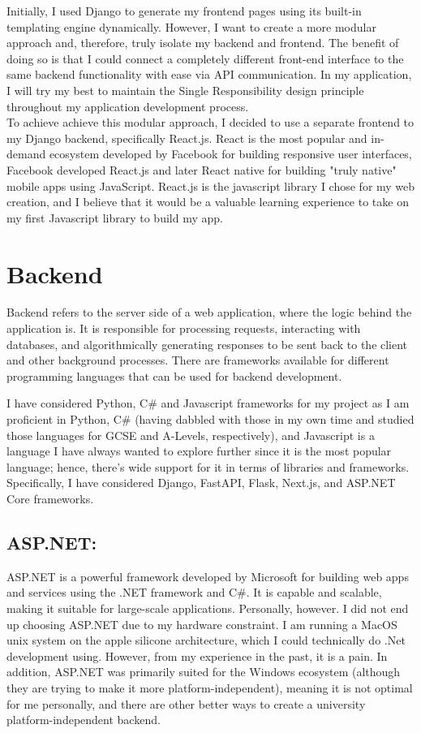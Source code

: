 Initially, I used Django to generate my frontend pages using its built-in templating engine dynamically. However, I want to create a more modular approach and, therefore, truly isolate my backend and frontend. The benefit of doing so is that I could connect a completely different front-end interface to the same backend functionality with ease via API communication. In my application, I will try my best to maintain the Single Responsibility design principle throughout my application development process.\\
To achieve achieve this modular approach, I decided to use a separate frontend to my Django backend, specifically React.js. React is the most popular and in-demand ecosystem developed by Facebook for building responsive user interfaces, Facebook developed React.js and later React native for building "truly native" mobile apps using JavaScript. React.js is the javascript library I chose for my web creation, and I believe that it would be a valuable learning experience to take on my first Javascript library to build my app.

\section{Backend}
Backend refers to the server side of a web application, where the logic behind the application is. It is responsible for processing requests, interacting with databases, and algorithmically generating responses to be sent back to the client and other background processes. There are frameworks available for different programming languages that can be used for backend development.

I have considered Python, C\# and Javascript frameworks for my project as I am proficient in Python, C\# (having dabbled with those in my own time and studied those languages for GCSE and A-Levels, respectively), and Javascript is a language I have always wanted to explore further since it is the most popular language; hence, there's wide support for it in terms of libraries and frameworks. Specifically, I have considered Django, FastAPI, Flask, Next.js, and ASP.NET Core frameworks.

\subsection{ASP.NET:}
ASP.NET is a powerful framework developed by Microsoft for building web apps and services using the .NET framework and C\#. It is capable and scalable, making it suitable for large-scale applications. Personally, however. I did not end up choosing ASP.NET due to my hardware constraint. I am running a MacOS unix system on the apple silicone architecture, which I could technically do .Net development using. However, from my experience in the past, it is a pain. In addition, ASP.NET was primarily suited for the Windows ecosystem (although they are trying to make it more platform-independent), meaning it is not optimal for me personally, and there are other better ways to create a university platform-independent backend.

